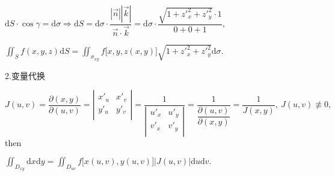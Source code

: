 \documentclass[UTF8]{ctexart}
\numberwithin{equation}{section}
\numberwithin{figure}{section}
\numberwithin{table}{section}
\newcommand\dif{\mathrm{d}}
\newcommand\no{\noindent}
\newcommand\dis{\displaystyle}
\begin{document}
\begin{spacing}{2}
\begin{enumerate}[itemindent=1.4em, label=(\arabic*)]
\textcolor[rgb]{1,0,0}{$\dis\dif S\cdot\cos\gamma=\dif\sigma\Longrightarrow\dif 
S=\dif\sigma\cdot
\dfrac{\left|\stackrel{\rightarrow}{n}\right|\left|\stackrel{\rightarrow}{k}\right|}
{\stackrel{\rightarrow}{n}\cdot\stackrel{\rightarrow}{k}}
=\dif\sigma\cdot\dfrac{\dis\sqrt{1+z'^2_x+z'^2_y}\cdot1}{0+0+1}$},

\vspace{0.2cm}

\centerline{$\dis\iint_Sf(x,y,z)\dif S=\iint_{\sigma_{xy}}f\big[x,y,z(x,y)\big]
\sqrt{1+z'^2_x+z'^2_y}\dif\sigma.$}

\end{enumerate}

\no2.变量代换

$\dis J(u,v)=\dfrac{\partial(x,y)}{\partial(u,v)}=
\left|\begin{array}{cc} 
    x'_u &    x'_v\\ 
    y'_u &    y'_v\\  
\end{array}\right|
=\dfrac{1}
{\left|\begin{array}{cc} 
    u'_x &    u'_y\\ 
    v'_x &    v'_y\\  
\end{array}\right|}
=\dfrac{1}{\dfrac{\partial(u,v)}{\partial(x,y)}}
=\dfrac{1}{J(x,y)},\ 
 J(u,v)\not\equiv0,\ $then

\vspace{0.2cm}

\centerline{$\dis\iint_{D_{xy}}\dif x\dif y
=\iint_{D_{uv}}f\big[x(u,v),y(u,v)\big]\big|J(u,v)\big|\dif u\dif v.$}


%


\end{spacing}
\end{document}
